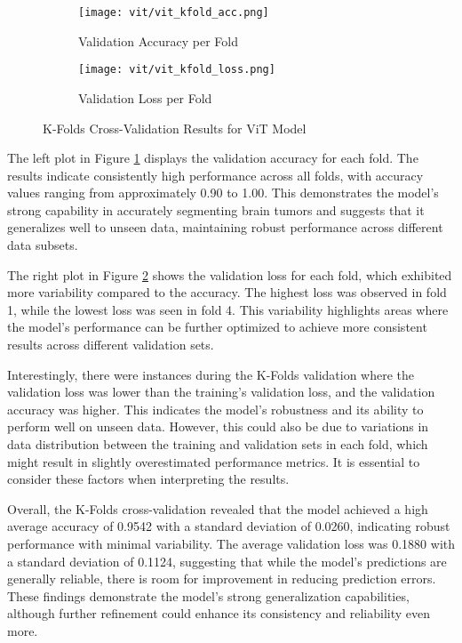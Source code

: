\begin{figure}[H]
  \centering
  \begin{subfigure}[b]{0.45\textwidth}
    \centering
    \texttt{[image: vit/vit\_kfold\_acc.png]}
    \caption{Validation Accuracy per Fold}
    \label{fig:vit_accuracy}
  \end{subfigure}
  \hfill
  \begin{subfigure}[b]{0.45\textwidth}
    \centering
    \texttt{[image: vit/vit\_kfold\_loss.png]}
    \caption{Validation Loss per Fold}
    \label{fig:vit_loss}
  \end{subfigure}
  \caption{K-Folds Cross-Validation Results for ViT Model}
  \label{fig:vit_kfolds}
\end{figure}

The left plot in Figure \ref{fig:vit_accuracy} displays the validation accuracy for each fold. The results indicate consistently high performance across all folds, with accuracy values ranging from approximately 0.90 to 1.00. This demonstrates the model's strong capability in accurately segmenting brain tumors and suggests that it generalizes well to unseen data, maintaining robust performance across different data subsets.

The right plot in Figure \ref{fig:vit_loss} shows the validation loss for each fold, which exhibited more variability compared to the accuracy. The highest loss was observed in fold 1, while the lowest loss was seen in fold 4. This variability highlights areas where the model's performance can be further optimized to achieve more consistent results across different validation sets.

Interestingly, there were instances during the K-Folds validation where the validation loss was lower than the training's validation loss, and the validation accuracy was higher. This indicates the model's robustness and its ability to perform well on unseen data. However, this could also be due to variations in data distribution between the training and validation sets in each fold, which might result in slightly overestimated performance metrics. It is essential to consider these factors when interpreting the results.

Overall, the K-Folds cross-validation revealed that the model achieved a high average accuracy of 0.9542 with a standard deviation of 0.0260, indicating robust performance with minimal variability. The average validation loss was 0.1880 with a standard deviation of 0.1124, suggesting that while the model's predictions are generally reliable, there is room for improvement in reducing prediction errors. These findings demonstrate the model's strong generalization capabilities, although further refinement could enhance its consistency and reliability even more.


